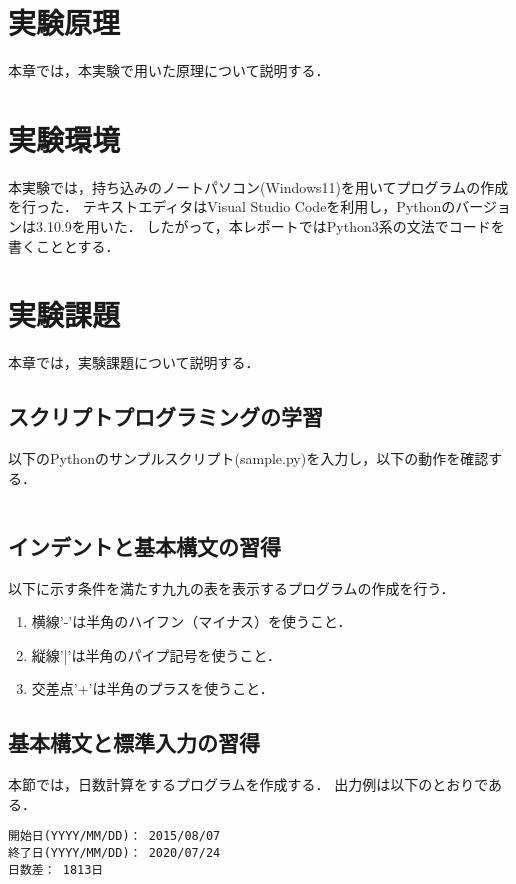 \documentclass[uplatex,dvipdfmx,12pt]{jsarticle}
\begin{document}
\newpage
\section{実験原理}
本章では，本実験で用いた原理について説明する．

\newpage
\section{実験環境}
本実験では，持ち込みのノートパソコン(Windows11)を用いてプログラムの作成を行った．
テキストエディタはVisual Studio Codeを利用し，Pythonのバージョンは3.10.9を用いた．
したがって，本レポートではPython3系の文法でコードを書くこととする．

\newpage
\section{実験課題}\label{sec:kadai}
本章では，実験課題について説明する．
\subsection{スクリプトプログラミングの学習}
以下のPythonのサンプルスクリプト(sample.py)を入力し，以下の動作を確認する．

\begin{lstlisting}

\end{lstlisting}
\subsection{インデントと基本構文の習得}
以下に示す条件を満たす九九の表を表示するプログラムの作成を行う．
\begin{enumerate}
\item 横線'-'は半角のハイフン（マイナス）を使うこと．
\item 縦線'|'は半角のパイプ記号を使うこと．
\item 交差点'+'は半角のプラスを使うこと．
\end{enumerate}



\subsection{基本構文と標準入力の習得}
本節では，日数計算をするプログラムを作成する．
出力例は以下のとおりである．

\begin{lstlisting}[caption={日数計算プログラムの出力例},label=dayPro]
開始日(YYYY/MM/DD)： 2015/08/07
終了日(YYYY/MM/DD)： 2020/07/24
日数差： 1813日
\end{lstlisting}
\end{document}
